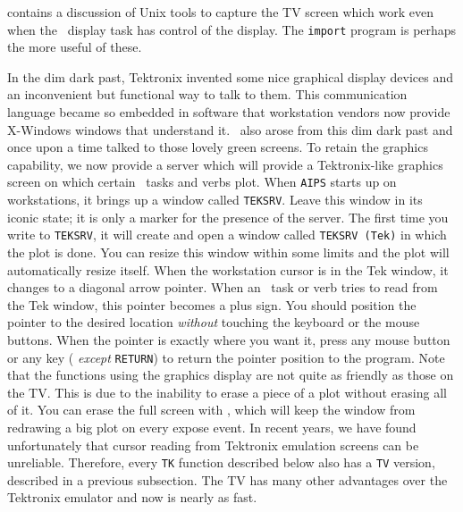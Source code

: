  contains a discussion of Unix tools to capture the TV
screen which work even when the \AIPS\ display task has control of the
display.  The {\tt import} program is perhaps the more useful of
these.


     In the dim dark past, Tektronix invented some nice graphical
display devices and an inconvenient but functional way to talk to
them.  This communication language became so embedded in software that
workstation vendors now provide X-Windows windows that understand it.
\AIPS\ also arose from this dim dark past and once upon a time talked
to those lovely green screens.  To retain the graphics capability, we
now provide a {\tt {}} server which will provide a
Tektronix-like graphics screen on which certain \AIPS\ tasks and verbs
plot.  When {\tt AIPS} starts up on workstations, it brings up a
window called {\tt TEKSRV}\@.  Leave this window in its iconic state;
it is only a marker for the presence of the server.  The first time
you write to {\tt TEKSRV}, it will create and open a window called
{\tt TEKSRV (Tek)} in which the plot is done.  You can resize this
window within some limits and the plot will automatically resize
itself. When the workstation cursor is in the Tek window, it changes
to a diagonal arrow pointer.  When an \AIPS\ task or verb tries to
read from the Tek window, this pointer becomes a plus sign.  You
should position the pointer to the desired location {\it without\/}
touching the keyboard or the mouse buttons.  When the pointer is
exactly where you want it, press any mouse button or any key ({\it
except\/} {\tt RETURN}) to return the pointer position to the program.
Note that the functions using the graphics display are not quite as
friendly as those on the TV\@.  This is due to the inability to erase
a piece of a plot without erasing all of it.  You can erase the full
screen with {\tt {}}, which will keep the window from
redrawing a big plot on every expose event.  In recent years, we have
found unfortunately that cursor reading from Tektronix emulation
screens can be unreliable.  Therefore, every {\tt TK} function
described below also has a {\tt TV} version, described in a previous
subsection.  The TV has many other advantages over the Tektronix
emulator and now is nearly as fast.


